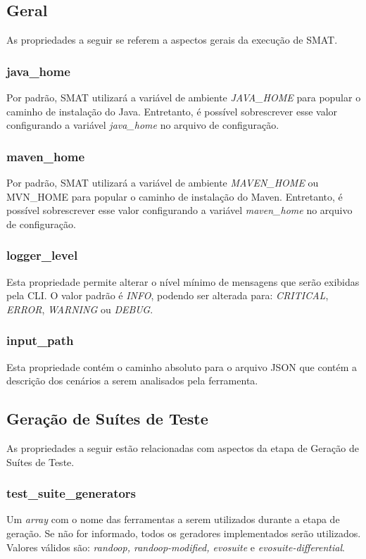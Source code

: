 \documentclass[12pt]{article}
\begin{document}
\subsection{Geral}
As propriedades a seguir se referem a aspectos gerais da execução de SMAT.

\subsubsection{java\_home}
Por padrão, SMAT utilizará a variável de ambiente \textit{JAVA\_HOME} para popular o caminho de instalação do Java. Entretanto, é possível sobrescrever esse valor configurando a variável \textit{java\_home} no arquivo de configuração.

\subsubsection{maven\_home}
Por padrão, SMAT utilizará a variável de ambiente \textit{MAVEN\_HOME} ou MVN\_HOME para popular o caminho de instalação do Maven. Entretanto, é possível sobrescrever esse valor configurando a variável \textit{maven\_home} no arquivo de configuração.

\subsubsection{logger\_level}
Esta propriedade permite alterar o nível mínimo de mensagens que serão exibidas pela CLI. O valor padrão é \textit{INFO}, podendo ser alterada para: \textit{CRITICAL}, \textit{ERROR}, \textit{WARNING} ou \textit{DEBUG}.

\subsubsection{input\_path}
Esta propriedade contém o caminho absoluto para o arquivo JSON que contém a descrição dos cenários a serem analisados pela ferramenta.

\subsection{Geração de Suítes de Teste}
As propriedades a seguir estão relacionadas com aspectos da etapa de Geração de Suítes de Teste.

\subsubsection{test\_suite\_generators}
Um \textit{array} com o nome das ferramentas a serem utilizados durante a etapa de geração. Se não for informado, todos os geradores implementados serão utilizados. Valores válidos são: \textit{randoop, randoop-modified, evosuite} e \textit{evosuite-differential}.
\end{document}
